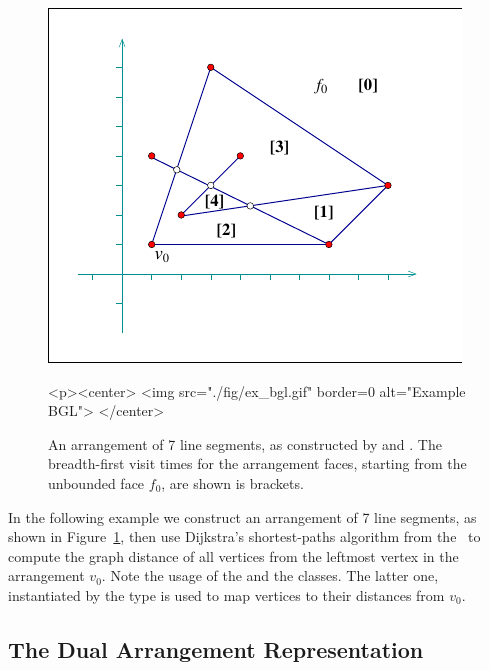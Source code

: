 \begin{figure}[t]
\begin{ccTexOnly}
  \begin{center}
  \includegraphics{Arrangement_2/fig/ex_bgl}
  \end{center}
\end{ccTexOnly}
\begin{ccHtmlOnly}
  <p><center>
  <img src="./fig/ex_bgl.gif" border=0 alt="Example BGL">
  </center>
\end{ccHtmlOnly}
\caption{An arrangement of 7 line segments, as constructed by
 and .
The breadth-first visit times for the arrangement faces, starting
from the unbounded face $f_0$, are shown is brackets.}
\label{arr_fig:ex_bgl}
\end{figure}

In the following example we construct an arrangement of 7 line segments,
as shown in Figure~\ref{arr_fig:ex_bgl},
then use Dijkstra's shortest-paths algorithm from the \bgl\ to compute
the graph distance of all vertices from the leftmost vertex in the
arrangement $v_0$. Note the usage of the  and
the  classes. The latter one, instantiated by
the type  is used to map vertices to their distances from $v_0$.


\subsection{The Dual Arrangement Representation}
\label{arr_ssec:bgl_dual}

